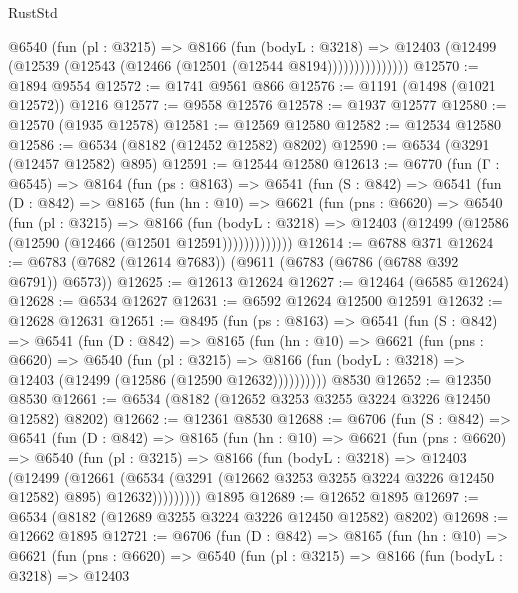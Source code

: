 \begin{lexlean}{RustStd}
\begin{coremodule}
                @6540
                  (fun (pl : @3215) =>
                  @8166
                    (fun (bodyL : @3218) =>
                    @12403 (@12499 (@12539 (@12543 (@12466 (@12501 (@12544 @8194)))))))))))))))
@12570 := @1894 @9554
@12572 := @1741 @9561 @866
@12576 := @1191 (@1498 (@1021 @12572)) @1216
@12577 := @9558 @12576
@12578 := @1937 @12577
@12580 := @12570 (@1935 @12578)
@12581 := @12569 @12580
@12582 := @12534 @12580
@12586 := @6534 (@8182 (@12452 @12582) @8202)
@12590 := @6534 (@3291 (@12457 @12582) @895)
@12591 := @12544 @12580
@12613 := @6770
    (fun (Γ : @6545) =>
    @8164
      (fun (ps : @8163) =>
      @6541
        (fun (S : @842) =>
        @6541
          (fun (D : @842) =>
          @8165
            (fun (hn : @10) =>
            @6621
              (fun (pns : @6620) =>
              @6540
                (fun (pl : @3215) =>
                @8166
                  (fun (bodyL : @3218) =>
                  @12403 (@12499 (@12586 (@12590 (@12466 (@12501 @12591)))))))))))))
@12614 := @6788 @371
@12624 := @6783 (@7682 (@12614 @7683)) (@9611 (@6783 (@6786 (@6788 @392 @6791)) @6573))
@12625 := @12613 @12624
@12627 := @12464 (@6585 @12624)
@12628 := @6534 @12627
@12631 := @6592 @12624 @12500 @12591
@12632 := @12628 @12631
@12651 := @8495
    (fun (ps : @8163) =>
    @6541
      (fun (S : @842) =>
      @6541
        (fun (D : @842) =>
        @8165
          (fun (hn : @10) =>
          @6621
            (fun (pns : @6620) =>
            @6540
              (fun (pl : @3215) =>
              @8166 (fun (bodyL : @3218) => @12403 (@12499 (@12586 (@12590 @12632))))))))))
    @8530
@12652 := @12350 @8530
@12661 := @6534 (@8182 (@12652 @3253 @3255 @3224 @3226 @12450 @12582) @8202)
@12662 := @12361 @8530
@12688 := @6706
    (fun (S : @842) =>
    @6541
      (fun (D : @842) =>
      @8165
        (fun (hn : @10) =>
        @6621
          (fun (pns : @6620) =>
          @6540
            (fun (pl : @3215) =>
            @8166
              (fun (bodyL : @3218) =>
              @12403
                (@12499
                  (@12661
                    (@6534
                      (@3291 (@12662 @3253 @3255 @3224 @3226 @12450 @12582) @895)
                      @12632)))))))))
    @1895
@12689 := @12652 @1895
@12697 := @6534 (@8182 (@12689 @3255 @3224 @3226 @12450 @12582) @8202)
@12698 := @12662 @1895
@12721 := @6706
    (fun (D : @842) =>
    @8165
      (fun (hn : @10) =>
      @6621
        (fun (pns : @6620) =>
        @6540
          (fun (pl : @3215) =>
          @8166
            (fun (bodyL : @3218) =>
            @12403

\end{coremodule}
\end{lexlean}
